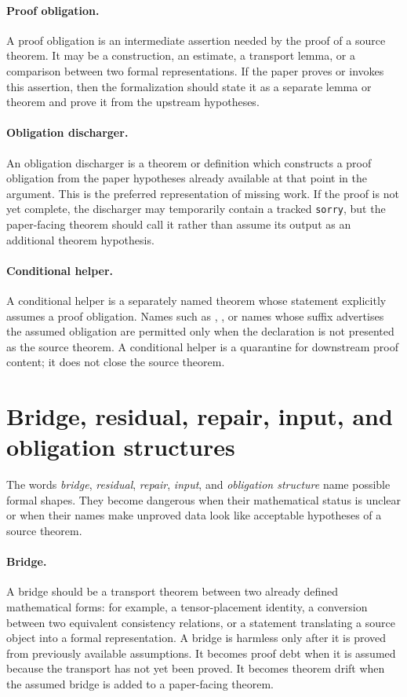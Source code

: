 \documentclass[11pt]{article}
\begin{document}
\paragraph{Proof obligation.}
A proof obligation is an intermediate assertion needed by the proof of a source
theorem.  It may be a construction, an estimate, a transport lemma, or a
comparison between two formal representations.  If the paper proves or invokes
this assertion, then the formalization should state it as a separate lemma or
theorem and prove it from the upstream hypotheses.

\paragraph{Obligation discharger.}
An obligation discharger is a theorem or definition which constructs a proof
obligation from the paper hypotheses already available at that point in the
argument.  This is the preferred representation of missing work.  If the proof
is not yet complete, the discharger may temporarily contain a tracked
\verb|sorry|, but the paper-facing theorem should call it rather than assume
its output as an additional theorem hypothesis.

\paragraph{Conditional helper.}
A conditional helper is a separately named theorem whose statement explicitly
assumes a proof obligation.  Names such as
,
, or names whose suffix advertises the
assumed obligation are permitted only when the declaration is not presented as
the source theorem.  A conditional helper is a quarantine for downstream proof
content; it does not close the source theorem.

\section{Bridge, residual, repair, input, and obligation structures}

The words \emph{bridge}, \emph{residual}, \emph{repair}, \emph{input}, and
\emph{obligation structure} name possible formal shapes.  They become dangerous
when their mathematical status is unclear or when their names make unproved
data look like acceptable hypotheses of a source theorem.

\paragraph{Bridge.}
A bridge should be a transport theorem between two already defined
mathematical forms: for example, a tensor-placement identity, a conversion
between two equivalent consistency relations, or a statement translating a
source object into a formal representation.  A bridge is harmless only after it
is proved from previously available assumptions.  It becomes proof debt when it
is assumed because the transport has not yet been proved.  It becomes theorem
drift when the assumed bridge is added to a paper-facing theorem.
\end{document}
